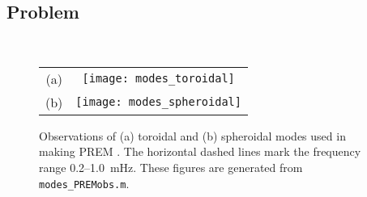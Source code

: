 \documentclass[11pt,titlepage,fleqn]{article}
\begin{document}

\subsection*{Problem} \howmuchtime\





%

\pagestyle{empty}

\clearpage\pagebreak
\begin{figure}
\centering
\begin{tabular}{cc}
(a) & \texttt{[image: modes\_toroidal]} \\
(b) & \texttt{[image: modes\_spheroidal]}
\end{tabular}
\caption[]
{{
Observations of (a) toroidal and (b) spheroidal modes used in making PREM \citep{PREM}.
The horizontal dashed lines mark the frequency range 0.2--1.0~mHz.
These figures are generated from {\tt modes\_PREMobs.m}.
}}
\label{fig:premmodes}
\end{figure}


\end{document}
